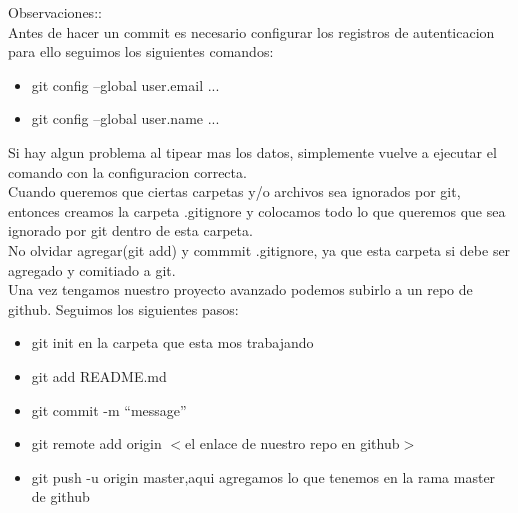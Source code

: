 \documentclass{book}
\begin{document}
Observaciones::\\
Antes de hacer un commit es necesario configurar los registros de autenticacion para ello seguimos los siguientes comandos:\\
\begin{itemize}
	\item git config --global user.email ...
	\item git config --global user.name ...
\end{itemize}
Si hay algun problema al tipear mas los datos, simplemente vuelve a ejecutar el comando con la configuracion correcta.\\

Cuando queremos que ciertas carpetas y/o archivos sea ignorados por git, entonces creamos la carpeta .gitignore y colocamos todo lo que queremos que sea ignorado por git dentro de esta carpeta.\\
No olvidar agregar(git add) y commmit .gitignore, ya que esta carpeta si debe ser agregado y comitiado a git.\\

Una vez tengamos nuestro proyecto avanzado podemos subirlo a un repo de github. Seguimos los siguientes pasos:\\
\begin{itemize}
	\item git init en la carpeta que esta mos trabajando
	\item git add README.md
	\item git commit -m ``message''
	\item git remote add origin $<$el enlace de nuestro repo en github$>$
	\item git push -u origin master,aqui agregamos lo que tenemos en la rama master de github
\end{itemize}
\end{document}
